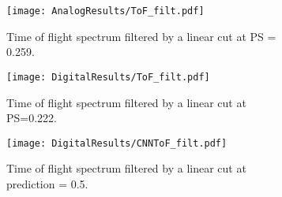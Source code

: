 \documentclass[main.tex]{subfiles}
\begin{document}
\begin{figure}
    \centering
    \begin{subfigure}[bh]{\textwidth}
   	   	\centering
	    \texttt{[image: AnalogResults/ToF\_filt.pdf]}
        \label{fig:ToF_filt_A}
    	\caption{Time of flight spectrum filtered by a linear cut at PS = 0.259.}
    	\label{fig:ToF_filt_A}
   	\end{subfigure}
    \begin{subfigure}[bh]{\textwidth}
   	    \centering
        \texttt{[image: DigitalResults/ToF\_filt.pdf]}
        \caption{Time of flight spectrum filtered by a linear cut at PS=0.222.}
        \label{fig:ToF_filt_D}
    \end{subfigure}
	\begin{subfigure}[bh]{\textwidth}
	    \centering
        \texttt{[image: DigitalResults/CNNToF\_filt.pdf]}
        \caption{Time of flight spectrum filtered by a linear cut at prediction = 0.5.}
        \label{fig:ToF_filt_D_CNN}
    \end{subfigure}
	
	\caption{}
    \label{fig:tof_cc_cnn}
\end{figure}
\end{document}
